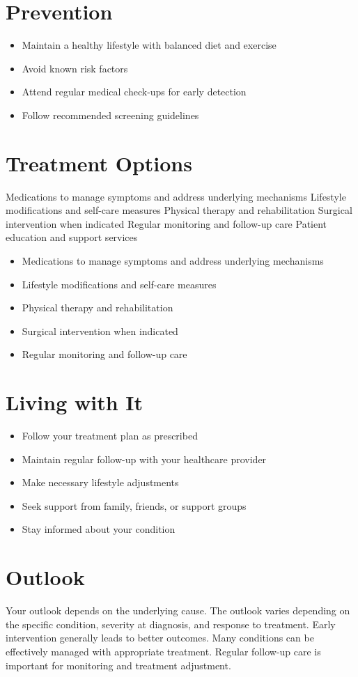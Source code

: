 \section{Prevention}
\begin{itemize}[noitemsep]
  \item Maintain a healthy lifestyle with balanced diet and exercise
  \item Avoid known risk factors
  \item Attend regular medical check-ups for early detection
  \item Follow recommended screening guidelines
\end{itemize}
\section{Treatment Options}
Medications to manage symptoms and address underlying mechanisms Lifestyle modifications and self-care measures Physical therapy and rehabilitation Surgical intervention when indicated Regular monitoring and follow-up care Patient education and support services

\begin{itemize}[noitemsep]
  \item Medications to manage symptoms and address underlying mechanisms
  \item Lifestyle modifications and self-care measures
  \item Physical therapy and rehabilitation
  \item Surgical intervention when indicated
  \item Regular monitoring and follow-up care
\end{itemize}
\section{Living with It}
\begin{itemize}[noitemsep]
  \item Follow your treatment plan as prescribed
  \item Maintain regular follow-up with your healthcare provider
  \item Make necessary lifestyle adjustments
  \item Seek support from family, friends, or support groups
  \item Stay informed about your condition
\end{itemize}
\section{Outlook}
Your outlook depends on the underlying cause. The outlook varies depending on the specific condition, severity at diagnosis, and response to treatment. Early intervention generally leads to better outcomes. Many conditions can be effectively managed with appropriate treatment. Regular follow-up care is important for monitoring and treatment adjustment.
